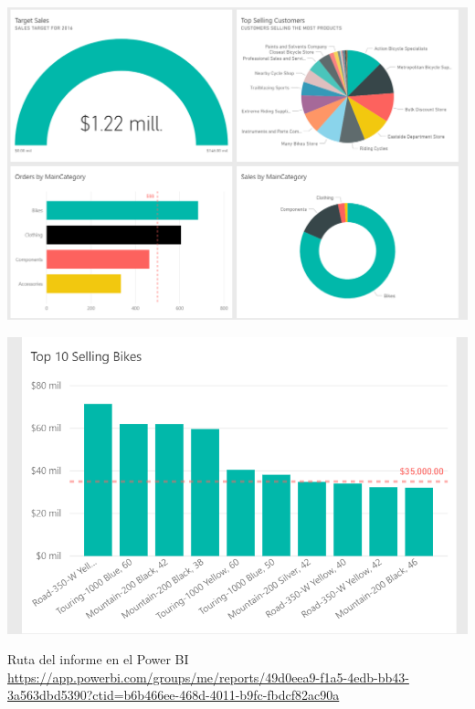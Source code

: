 \begin{itemize}
\begin{enumerate}
\begin{center}
\includegraphics[scale=0.60]{./Imagenes/ejer3_panel1.png}
\end{center}
\begin{center}
\includegraphics[scale=0.55]{./Imagenes/ejer3_panel2.png}
\end{center}

Ruta del informe en el Power BI
\\
\url{https://app.powerbi.com/groups/me/reports/49d0eea9-f1a5-4edb-bb43-3a563dbd5390?ctid=b6b466ee-468d-4011-b9fc-fbdcf82ac90a} 

\end{enumerate}

\end{itemize}







